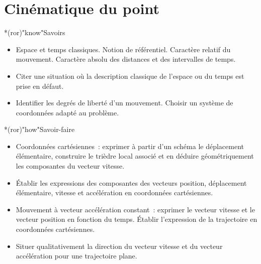 \documentclass[../../main/main.tex]{subfiles}
\begin{document}
\setcounter{chapter}{0}

\chapter{Cin\'ematique du point}

\vfill

\begin{prgm}
	\begin{tcb}*(ror)"know"{Savoirs}
		\begin{itemize}
			\item Espace et temps classiques. Notion de référentiel. Caractère relatif
			      du mouvement. Caractère absolu des distances et des intervalles de
			      temps.
			\item Citer une situation où la description classique de l'espace ou du
			      temps est prise en défaut.

			\item Identifier les degrés de liberté d'un mouvement. Choisir un système
			      de coordonnées adapté au problème.
		\end{itemize}
	\end{tcb}
	\begin{tcb}*(ror)"how"{Savoir-faire}
		\begin{itemize}
			\item Coordonnées cartésiennes~: exprimer à partir d'un schéma le
			      déplacement élémentaire, construire le trièdre local associé et en
			      déduire géométriquement les composantes du vecteur vitesse.

			\item Établir les expressions des composantes des vecteurs position,
			      déplacement élémentaire, vitesse et accélération en coordonnées
			      cartésiennes.

			\item Mouvement à vecteur accélération constant~: exprimer le vecteur
			      vitesse et le vecteur position en fonction du temps. Établir
			      l'expression de la trajectoire en coordonnées cartésiennes.

			\item Situer qualitativement la direction du vecteur vitesse et du
			      vecteur accélération pour une trajectoire plane.
		\end{itemize}
	\end{tcb}
\end{prgm}

\vfill

\end{document}
